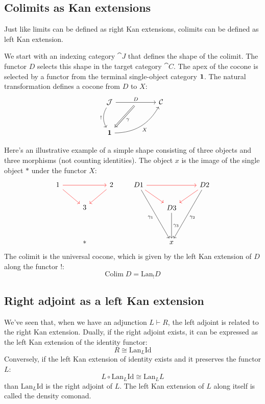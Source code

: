 \documentclass[DaoFP]{subfiles}
\begin{document}
\subsection{Colimits as Kan extensions}

Just like limits can be defined as right Kan extensions, colimits can be defined as left Kan extension. 

We start with an indexing category $\cat J$ that defines the shape of the colimit. The functor $D$ selects this shape in the target category $\cat C$. The apex of the cocone is selected by a functor from the terminal single-object category $\mathbf{1}$. The natural transformation defines a cocone from $D$ to $X$:
\[
 \begin{tikzcd} [row sep=1cm, column sep=1cm]
 \cat J
 \arrow[rr, "D", "" {name=ID, below} ]
 \arrow[d, bend right, "!"']
 && \cat C
 \\
 \Cat 1
  \arrow[urr, bend right, "X"']
 \arrow[Rightarrow, "\gamma",  from=ID]
 \end{tikzcd}
\]

Here's an illustrative example of a simple shape consisting of three objects and three morphisms (not counting identities). The object $x$ is the image of the single object $*$ under the functor $X$:
\[
 \begin{tikzcd}
1 
\arrow[rr, red]
\arrow[rd, red]
&& 2
\arrow[dl, red]
\\
& 3
\\
\\
& *
 \end{tikzcd}
 \qquad
 \begin{tikzcd}
D 1 
\arrow[rr, red]
\arrow[rd, red]
\arrow[dddr, "\gamma_1"']
&& D 2
\arrow[dl, red]
\arrow[dddl, "\gamma_2"]
\\
& D 3
\arrow[dd, "\gamma_3"]
\\
\\
&x
 \end{tikzcd}
 \]
The colimit is the universal cocone, which is given by the left Kan extension of $D$ along the functor $!$:
\[ \text{Colim}\; D = \text{Lan}_! D \]


\subsection{Right adjoint as a left Kan extension}

We've seen that, when we have an adjunction $L \vdash R$, the left adjoint is related to the right Kan extension. Dually, if the right adjoint exists, it can be expressed as the left Kan extension of the identity functor:
\[ R \cong \text{Lan}_L \text{Id} \]
Conversely, if the left Kan extension of identity exists and it preserves the functor $L$:
\[ L \circ \text{Lan}_L \text{Id} \cong \text{Lan}_L L \]
than $\text{Lan}_L \text{Id}$ is the right adjoint of $L$. The left Kan extension of $L$ along itself is called the  density comonad.
\end{document}

